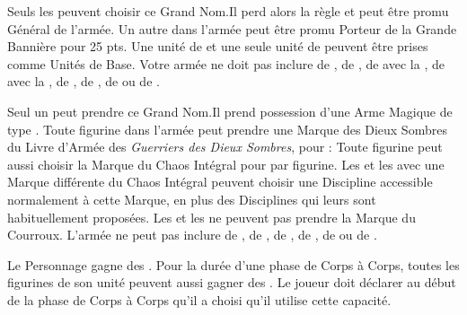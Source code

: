 \begin{multicols}{2}
\startpricelistNSP

Seuls les \mammothhunters{} peuvent choisir ce Grand Nom.\newline Il perd alors la règle \notaleader{} et peut être promu Général de l'armée. Un autre \mammothhunter{} dans l'armée peut être promu Porteur de la Grande Bannière pour 25 pts. Une unité de \yetis{} et une seule unité de \sabretoothtigers{} peuvent être prises comme Unités de Base. Votre armée ne doit pas inclure de \greatkhans{}, de \khans{}, de \shamans{} avec la \fireblessing{}, de \greatshamans{} avec la \greaterfireblessing{}, de \bruisers{}, de \mercenaryveterans{}, de \bombardiers{} ou de \thundercannons{}.

Seul un \greatkhan{} peut prendre ce Grand Nom.\newline Il prend possession d'une Arme Magique de type \ironfist{}. Toute figurine dans l'armée peut prendre une Marque des Dieux Sombres du Livre d'Armée des \textit{Guerriers des Dieux Sombres}, pour  :
Toute figurine peut aussi choisir la Marque du Chaos Intégral pour  par figurine.\newline
Les \shamans{} et les \greatshamans{} avec une Marque différente du Chaos Intégral peuvent choisir une Discipline accessible normalement à cette Marque, en plus des Disciplines qui leurs sont habituellement proposées. Les \shamans{} et les \greatshamans{} ne peuvent pas prendre la Marque du Courroux.\newline
L'armée ne peut pas inclure de \mammothhunters{}, de \scraplings{}, de \scraplingtrappers{}, de \yetis{}, de \sabretoothtigers{} ou de \scratapults{}.

Le Personnage gagne des \poisonedattacks{}. Pour la durée d'une phase de Corps à Corps, toutes les figurines de son unité peuvent aussi gagner des \poisonedattacks{}. Le joueur doit déclarer au début de la phase de Corps à Corps qu'il a choisi qu'il utilise cette capacité.


\end{multicols}
